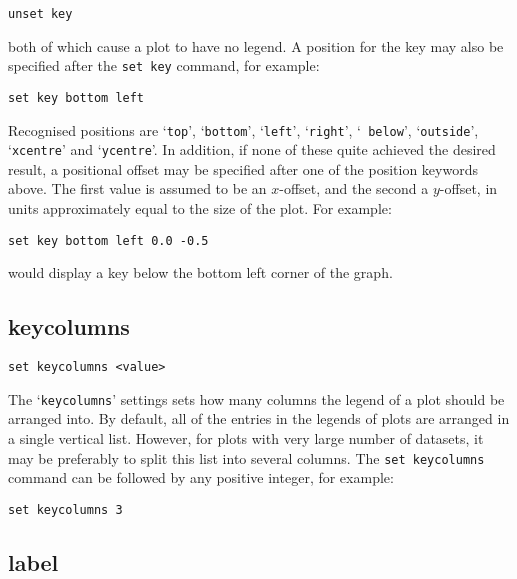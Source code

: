 \documentclass[a4paper,onecolumn,11pt]{book}
\begin{document}
\begin{verbatim}
unset key
\end{verbatim}

\noindent both of which cause a plot to have no legend. A position for the key may also
be specified after the {\tt set key} command, for example:

\begin{verbatim}
set key bottom left
\end{verbatim}

Recognised positions are `{\tt top}', `{\tt bottom}', `{\tt left}', `{\tt right}', `{\tt
below}', `{\tt outside}', `{\tt xcentre}' and `{\tt ycentre}'. In addition, if none of
these quite achieved the desired result, a positional offset may be specified
after one of the position keywords above.  The first value is assumed to be an
$x$-offset, and the second a $y$-offset, in units approximately equal to the
size of the plot. For example:

\begin{verbatim}
set key bottom left 0.0 -0.5
\end{verbatim}

\noindent would display a key below the bottom left corner of the graph.


\subsection{keycolumns}

\begin{verbatim}
set keycolumns <value>
\end{verbatim}

The `{\tt keycolumns}' settings sets how many columns the legend of a plot should
be arranged into. By default, all of the entries in the legends of plots are
arranged in a single vertical list. However, for plots with very large number
of datasets, it may be preferably to split this list into several columns. The
{\tt set keycolumns} command can be followed by any positive integer, for
example:

\begin{verbatim}
set keycolumns 3
\end{verbatim}


\subsection{label}
\end{document}
